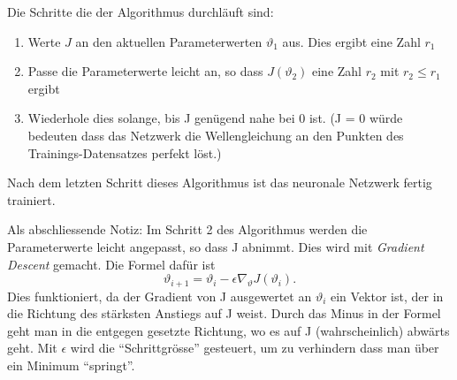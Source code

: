 Die Schritte die der Algorithmus durchläuft sind:
\begin{enumerate}
    \item Werte \( J \) an den aktuellen Parameterwerten \( \vartheta_1 \) aus. Dies ergibt eine Zahl \( r_1 \)
    \item Passe die Parameterwerte leicht an, so dass \( J(\vartheta_2) \) eine Zahl \( r_2 \) mit \( r_2 \leq r_1 \) ergibt
    \item Wiederhole dies solange, bis J genügend nahe bei 0 ist. (J = 0 würde bedeuten dass das Netzwerk die Wellengleichung an den Punkten des Trainings-Datensatzes perfekt löst.)
\end{enumerate}

Nach dem letzten Schritt dieses Algorithmus ist das neuronale Netzwerk fertig trainiert.

Als abschliessende Notiz: Im Schritt 2 des Algorithmus werden die Parameterwerte leicht angepasst, so dass J abnimmt.
Dies wird mit \emph{Gradient Descent} gemacht. Die Formel dafür ist
\begin{equation}
    \vartheta_{i+1} = \vartheta_i - \epsilon \nabla_\vartheta J\left(\vartheta_i\right).
\end{equation}
Dies funktioniert, da der Gradient von J ausgewertet an \( \vartheta_i \) ein Vektor ist, der in die Richtung des stärksten Anstiegs auf J weist.
Durch das Minus in der Formel geht man in die entgegen gesetzte Richtung, wo es auf J (wahrscheinlich) abwärts geht. 
Mit \( \epsilon \) wird die ``Schrittgrösse'' gesteuert, um zu verhindern dass man über ein Minimum ``springt''.

